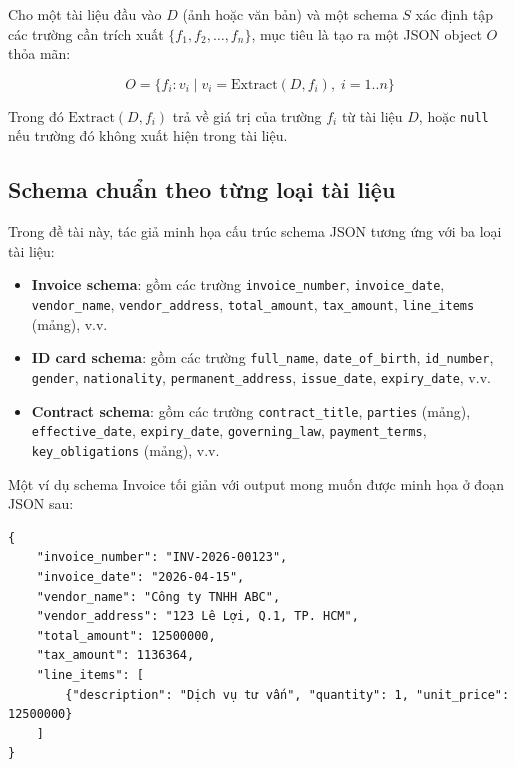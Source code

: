 ﻿\documentclass[12pt]{report}
\begin{document}
Cho một tài liệu đầu vào $D$ (ảnh hoặc văn bản) và một schema $S$ xác định tập các trường cần trích xuất $\{f_1, f_2, \ldots, f_n\}$, mục tiêu là tạo ra một JSON object $O$ thỏa mãn:

\begin{equation}
    O = \{f_i: v_i \mid v_i = \text{Extract}(D, f_i), \; i = 1..n\}
\end{equation}

Trong đó $\text{Extract}(D, f_i)$ trả về giá trị của trường $f_i$ từ tài liệu $D$, hoặc \texttt{null} nếu trường đó không xuất hiện trong tài liệu.

\subsection{Schema chuẩn theo từng loại tài liệu}\label{sec:schemas}

Trong đề tài này, tác giả minh họa cấu trúc schema JSON tương ứng với ba loại tài liệu:

\begin{itemize}
    \item \textbf{Invoice schema}: gồm các trường \texttt{invoice\_number}, \texttt{invoice\_date}, \texttt{vendor\_name}, \texttt{vendor\_address}, \texttt{total\_amount}, \texttt{tax\_amount}, \texttt{line\_items} (mảng), v.v.
    \item \textbf{ID card schema}: gồm các trường \texttt{full\_name}, \texttt{date\_of\_birth}, \texttt{id\_number}, \texttt{gender}, \texttt{nationality}, \texttt{permanent\_address}, \texttt{issue\_date}, \texttt{expiry\_date}, v.v.
    \item \textbf{Contract schema}: gồm các trường \texttt{contract\_title}, \texttt{parties} (mảng), \texttt{effective\_date}, \texttt{expiry\_date}, \texttt{governing\_law}, \texttt{payment\_terms}, \texttt{key\_obligations} (mảng), v.v.
\end{itemize}

Một ví dụ schema Invoice tối giản với output mong muốn được minh họa ở đoạn JSON sau:

\begin{verbatim}
{
    "invoice_number": "INV-2026-00123",
    "invoice_date": "2026-04-15",
    "vendor_name": "Công ty TNHH ABC",
    "vendor_address": "123 Lê Lợi, Q.1, TP. HCM",
    "total_amount": 12500000,
    "tax_amount": 1136364,
    "line_items": [
        {"description": "Dịch vụ tư vấn", "quantity": 1, "unit_price": 12500000}
    ]
}
\end{verbatim}
\end{document}
